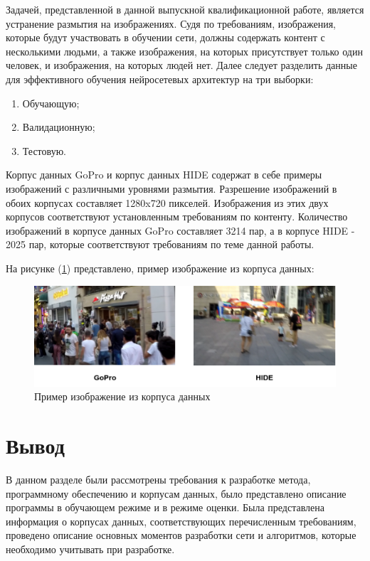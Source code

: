 Задачей, представленной в данной выпускной квалификационной работе, является устранение размытия на изображениях. Судя по требованиям, изображения, которые будут участвовать в обучении сети, должны содержать контент с несколькими людьми, а также изображения, на которых присутствует только один человек, и изображения, на которых людей нет. Далее следует разделить данные для эффективного обучения нейросетевых архитектур на три выборки:
\begin{enumerate}
    \item Обучающую;
    \item Валидационную;
    \item Тестовую.
\end{enumerate}

Корпус данных GoPro \cite{nah2017deep} и корпус данных HIDE \cite{shen2019human} содержат в себе примеры изображений с различными уровнями размытия. Разрешение изображений в обоих корпусах составляет 1280x720 пикселей. Изображения из этих двух корпусов соответствуют установленным требованиям по контенту. Количество изображений в корпусе данных GoPro составляет 3214 пар, а в корпусе HIDE - 2025 пар, которые соответствуют требованиям по теме данной работы.

На рисунке (\ref{fig:dataset-example}) представлено, пример изображение из корпуса данных: 
\begin{figure}[H]
	\centering
	\includegraphics[width=0.75\linewidth]{assets/dataset-example.png}
	\caption{Пример изображение из корпуса данных}
	\label{fig:dataset-example}
\end{figure}

\section*{Вывод}

В данном разделе были рассмотрены требования к разработке метода, программному обеспечению и корпусам данных, было представлено описание программы в обучающем режиме и в режиме оценки. Была представлена информация о корпусах данных, соответствующих перечисленным требованиям, проведено описание основных моментов разработки сети и алгоритмов, которые необходимо учитывать при разработке.
